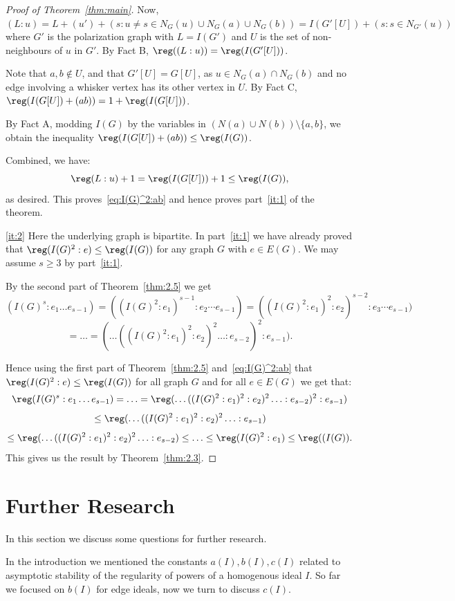 \begin{proof}[Proof of Theorem~\ref{thm:main}]
Now, $(L:u)=L+(u')+(s: u\neq s\in N_G(u)\cup N_G(a)\cup N_G(b))=I(G'[U])+(s: s\in N_{G'}(u))$ where $G'$ is the polarization graph with $L=I(G')$ and $U$ is the set of non-neighbours of $u$ in $G'$.
By Fact B, $\reg((L:u))=\reg(I(G'[U]))$.

Note that  $a,b\notin
U$, and that $G'[U]=G[U]$, as $u\in N_G(a)\cap N_G(b)$ and no edge involving a whisker vertex has its other vertex in $U$.
By Fact C,
$\reg(I(G[U])+(ab))=1+\reg(I(G[U]))$.

By Fact A, modding $I(G)$ by the variables in $(N(a)\cup N(b))\setminus \{a,b\}$, we obtain the inequality $\reg(I(G[U])+(ab))\leq \reg(I(G))$.
    
Combined, we have: $$\reg(L:u)+1=\reg(I(G[U]))+1\leq \reg(I(G)), $$
as desired. 
This proves~\eqref{eq:I(G)^2:ab} and hence proves part~\ref{it:1} of the theorem.

\ref{it:2} Here the underlying graph is bipartite. In part~\ref{it:1} we have already proved that $\reg(I(G)^2:e)\leq \reg(I(G))$ for any graph $G$ with $e \in E(G)$. We may assume $s \geq 3$ by part~\ref{it:1}.


By the second part of Theorem~\ref{thm:2.5} we get
$$ (I(G)^s:e_1\ldots e_{s-1}) =  ((I(G)^2:e_1)^{s-1}: e_2 \cdots e_{s-1})=  ((I(G)^2:e_1)^2 : e_2)^{s-2}: e_3 \cdots e_{s-1})$$
$$ = \ldots  =(\ldots((I(G)^2:e_1)^2 : e_2)^2 \ldots : e_{s-2})^2 : e_{s-1}).$$

Hence using the first part of Theorem~\ref{thm:2.5} and~\eqref{eq:I(G)^2:ab} that $\reg(I(G)^2:e)\leq \reg(I(G))$ for all graph $G$ and for all $e \in E(G)$ we get that:
$$ \reg(I(G)^s:e_1\ldots e_{s-1}) =
\ldots =
\reg (\ldots((I(G)^2:e_1)^2 : e_2)^2 \ldots : e_{s-2})^2 : e_{s-1})$$
$$\leq \reg  (\ldots((I(G)^2:e_1)^2 : e_2)^2 \ldots : e_{s-1})$$
$$\leq \reg  (\ldots((I(G)^2:e_1)^2 : e_2)^2 \ldots : e_{s-2})\leq \ldots \leq \reg (I(G)^2:e_1)\leq \reg((I(G)).$$
This gives us the result by Theorem~\ref{thm:2.3}.
\end{proof}

\section{Further Research}\label{sec:further}
 In this section we discuss some questions for further research.
 
In the introduction we mentioned the constants $a(I), b(I), c(I)$ related to
asymptotic stability of the regularity of powers of a homogenous ideal $I$. So far we focused on $b(I)$ for edge ideals, now we turn to discuss $c(I)$.

